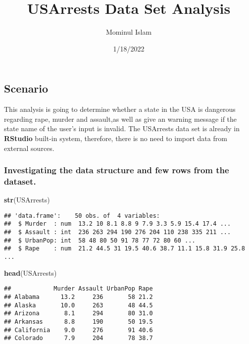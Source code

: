 \documentclass[
]{article}
\title{USArrests Data Set Analysis}
\author{Mominul Islam}
\date{1/18/2022}
\newenvironment{Shaded}{\begin{snugshade}}{\end{snugshade}}
\newcommand{\KeywordTok}[1]{\textcolor[rgb]{0.13,0.29,0.53}{\textbf{#1}}}
\newcommand{\NormalTok}[1]{#1}
\begin{document}
\maketitle

\hypertarget{scenario}{%
\subsection{Scenario}\label{scenario}}

This analysis is going to determine whether a state in the USA is
dangerous regarding rape, murder and assault,as well as give an warning
message if the state name of the user's input is invalid. The USArrests
data set is already in \textbf{RStudio} built-in system, therefore,
there is no need to import data from external sources.

\hypertarget{investigating-the-data-structure-and-few-rows-from-the-dataset.}{%
\subsubsection{Investigating the data structure and few rows from the
dataset.}\label{investigating-the-data-structure-and-few-rows-from-the-dataset.}}

\begin{Shaded}
\begin{Highlighting}[]
\KeywordTok{str}\NormalTok{(USArrests)}
\end{Highlighting}
\end{Shaded}

\begin{verbatim}
## 'data.frame':    50 obs. of  4 variables:
##  $ Murder  : num  13.2 10 8.1 8.8 9 7.9 3.3 5.9 15.4 17.4 ...
##  $ Assault : int  236 263 294 190 276 204 110 238 335 211 ...
##  $ UrbanPop: int  58 48 80 50 91 78 77 72 80 60 ...
##  $ Rape    : num  21.2 44.5 31 19.5 40.6 38.7 11.1 15.8 31.9 25.8 ...
\end{verbatim}

\begin{Shaded}
\begin{Highlighting}[]
\KeywordTok{head}\NormalTok{(USArrests)}
\end{Highlighting}
\end{Shaded}

\begin{verbatim}
##            Murder Assault UrbanPop Rape
## Alabama      13.2     236       58 21.2
## Alaska       10.0     263       48 44.5
## Arizona       8.1     294       80 31.0
## Arkansas      8.8     190       50 19.5
## California    9.0     276       91 40.6
## Colorado      7.9     204       78 38.7
\end{verbatim}
\end{document}
